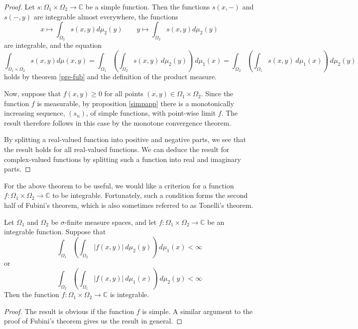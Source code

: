 \begin{proof}
Let $s\colon \Omega_1 \times \Omega_2 \rightarrow {\mathbb C}$ be a simple function.  Then the functions $s(x,-)$ and $s(-,y)$ are integrable almost everywhere, the functions
$$x\mapsto \int_{\Omega_2} s(x,y) d\mu_2 (y) \qquad y\mapsto \int_{\Omega_2} s(x,y) d\mu_2 (y)$$
are integrable, and the equation
$$\int_{\Omega_1 \times \Omega_2} s(x,y) d\mu (x,y)
=\int_{\Omega_1} \left( \int_{\Omega_2}  s (x,y) \ d\mu_2 (y) \right) \ d\mu_1 (x)= \int_{\Omega_2} \left( \int_{\Omega_1} s (x,y) \ d\mu_1 (x) \right) \ d\mu_2 (y)$$ 
holds by theorem \ref{pre-fub} and the definition of the product measure.

Now, suppose that $f(x,y)\geq 0$ for all points $(x,y)\in \Omega_1 \times \Omega_2$.  Since the function $f$ is measurable, by proposition \ref{simpapp} there is a monotonically increasing sequence, $(s_n)$, of simple functions, with point-wise limit $f$.  The result therefore follows in this case by the monotone convergence theorem.

By splitting a real-valued function into positive and negative parts, we see that the result holds for all real-valued functions.  We can deduce the result for complex-valued functions by splitting such a function into real and imaginary parts.
\end{proof}

For the above theorem to be useful, we would like a criterion for a function $f\colon \Omega_1 \times \Omega_2 \rightarrow {\mathbb C}$ to be integrable.  Fortunately, such a condition forms the second half of Fubini's theorem, which is also sometimes referred to as Tonelli's theorem.

\begin{theorem}
Let $\Omega_1$ and $\Omega_2$ be $\sigma$-finite measure spaces, and let $f\colon \Omega_1 \times \Omega_2 \rightarrow {\mathbb C}$ be an integrable function.  Suppose that
$$\int_{\Omega_1} \left( \int_{\Omega_2}  |f (x,y)| \ d\mu_2 (y) \right) \ d\mu_1 (x) <\infty$$
or
$$\int_{\Omega_2} \left( \int_{\Omega_1} |f (x,y)| \ d\mu_1 (x) \right) \ d\mu_2 (y)< \infty$$ 
Then the function $f\colon \Omega_1\times \Omega_2 \rightarrow {\mathbb C}$ is integrable.
\end{theorem}

\begin{proof}
The result is obvious if the function $f$ is simple.  A similar argument to the proof of Fubini's theorem gives us the result in general.
\end{proof}


